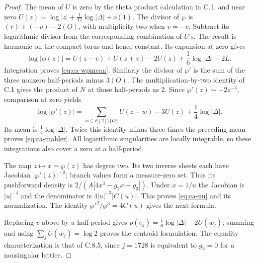 \begin{proof}
The mean of $U$ is zero by the theta product calculation in C.1,
and near zero
$U(z)=\log|z|+\frac1{12}\log|\Delta|+o(1)$.
The divisor of $\wp$ is $(v)+(-v)-2(O)$, with multiplicity
two when $v=-v$. Subtract its logarithmic divisor from the
corresponding combination of $U$'s. The result is harmonic
on the compact torus and hence constant. Its expansion at
zero gives
\[
 \log|\wp(z)|=U(z-v)+U(z+v)-2U(z)
                  +\frac16\log|\Delta|-2L.
\]
Integration proves \eqref{eq:ca-wpmean}.
Similarly the divisor of $\wp'$ is the sum of the three
nonzero half-periods minus $3(O)$. The multiplication-by-two
identity of C.1 gives the product of $N$ at those half-periods
as $2$. Since $\wp'(z)\sim-2z^{-3}$, comparison at zero yields
\[
 \log|\wp'(z)|=\sum_{w\in E[2]\setminus\{O\}}U(z-w)-3U(z)
                         +\frac14\log|\Delta|.
\]
Its mean is $\frac14\log|\Delta|$. Twice this identity minus
three times the preceding mean proves \eqref{eq:ca-mahler}.
All logarithmic singularities are locally integrable, so these
integrations also cover a zero at a half-period.

The map $z\mapsto x=\wp(z)$ has degree two. Its two inverse
sheets each have Jacobian $|\wp'(z)|^{-2}$; branch values form
a measure-zero set. Thus its pushforward density is
$2/(A|4x^3-g_2x-g_3|)$. Under $x=1/u$ the Jacobian is
$|u|^{-4}$ and the denominator is $4|u|^{-3}|C(u)|$.
This proves \eqref{eq:ca-nu} and its normalization. The identity
$\wp'^2/\wp^3=4C(u)$ gives the next formula.

Replacing $v$ above by a half-period gives
$p(e_j)=\frac16\log|\Delta|-2U(w_j)$; summing and using
$\sum_jU(w_j)=\log2$ proves the centroid formulation.
The equality characterization is that of C.8.5,
since $j=1728$ is equivalent to $g_3=0$ for a nonsingular lattice.
\end{proof}

